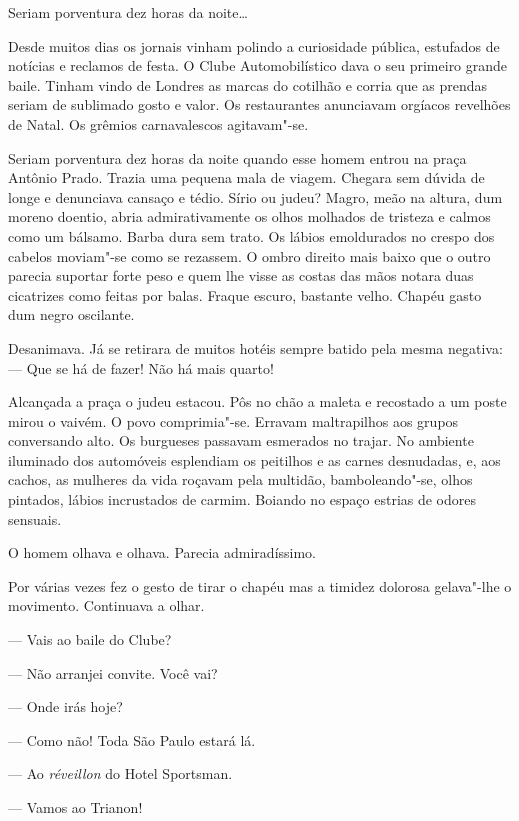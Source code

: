 \begin{linenumbers}

\noindent{}Seriam porventura dez horas da noite\ldots{}

Desde muitos dias os jornais vinham polindo a curiosidade pública,
estufados de notícias e reclamos de festa. O Clube Automobilístico dava
o seu primeiro grande baile. Tinham vindo de Londres as marcas do
cotilhão e corria que as prendas seriam de sublimado gosto e valor. Os
restaurantes anunciavam orgíacos revelhões de Natal. Os grêmios
carnavalescos agitavam"-se.

Seriam porventura dez horas da noite quando esse homem entrou na praça
Antônio Prado. Trazia uma pequena mala de viagem. Chegara sem dúvida de
longe e denunciava cansaço e tédio. Sírio ou judeu? Magro, meão na
altura, dum moreno doentio, abria admirativamente os olhos molhados de
tristeza e calmos como um bálsamo. Barba dura sem trato. Os lábios
emoldurados no crespo dos cabelos moviam"-se como se rezassem. O ombro
direito mais baixo que o outro parecia suportar forte peso e quem lhe
visse as costas das mãos notara duas cicatrizes como feitas por balas.
Fraque escuro, bastante velho. Chapéu gasto dum negro oscilante.

Desanimava. Já se retirara de muitos hotéis sempre batido pela mesma
negativa: --- Que se há de fazer! Não há mais quarto!

Alcançada a praça o judeu estacou. Pôs no chão a maleta e recostado a um
poste mirou o vaivém. O povo comprimia"-se. Erravam maltrapilhos aos
grupos conversando alto. Os burgueses passavam esmerados no trajar. No
ambiente iluminado dos automóveis esplendiam os peitilhos e as carnes
desnudadas, e, aos cachos, as mulheres da vida roçavam pela multidão,
bamboleando"-se, olhos pintados, lábios incrustados de carmim. Boiando no
espaço estrias de odores sensuais.

O homem olhava e olhava. Parecia admiradíssimo.

Por várias vezes fez o gesto de tirar o chapéu mas a timidez dolorosa
gelava"-lhe o movimento. Continuava a olhar.

--- Vais ao baile do Clube?

--- Não arranjei convite. Você vai?

--- Onde irás hoje?

--- Como não! Toda São Paulo estará lá.

--- Ao \emph{réveillon} do Hotel Sportsman.

--- Vamos ao Trianon!


\end{linenumbers}
